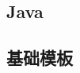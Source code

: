 \documentclass[landscape, twoside, a4paper]{article}
\newcommand{\javacode}[1]{
	\inputminted[mathescape,
	frame=lines,linenos]{java}{source/#1}
}
\begin{document}
\begin{multicols}{2}
\begin{spacing}{0.8}




\section{Java}
\subsection{基础模板}
\javacode{template.java}



		\end{spacing}
	\end{multicols}
\end{document}
